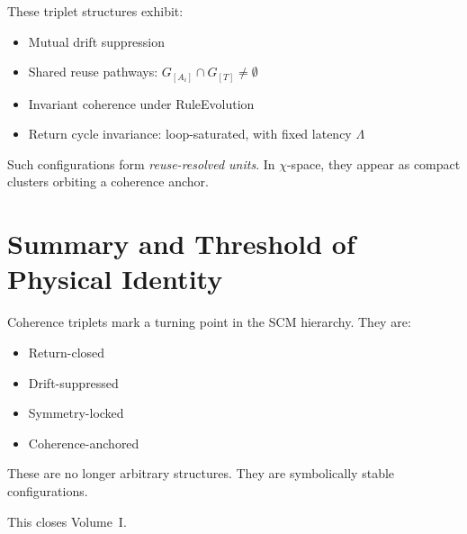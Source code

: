 These triplet structures exhibit:
\begin{itemize}
  \item Mutual drift suppression
  \item Shared reuse pathways: $G_{[A_i]} \cap G_{[T]} \ne \emptyset$
  \item Invariant coherence under RuleEvolution
  \item Return cycle invariance: loop-saturated, with fixed latency $\Lambda$
\end{itemize}

Such configurations form \textit{reuse-resolved units}.  
In $\chi$-space, they appear as compact clusters orbiting a coherence anchor.

\section{Summary and Threshold of Physical Identity} \label{summary-and-threshold-of-physical-identity}

Coherence triplets mark a turning point in the SCM hierarchy.  
They are:

\begin{itemize}
  \item Return-closed
  \item Drift-suppressed
  \item Symmetry-locked
  \item Coherence-anchored
\end{itemize}

These are no longer arbitrary structures.  
They are symbolically stable configurations.

\medskip

This closes Volume~I.
